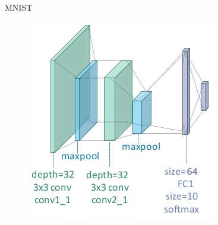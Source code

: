 \documentclass{beamer}
\begin{document}
\begin{frame}{MNIST}
			\begin{figure}
		\includegraphics[width=0.6\columnwidth]{pres_pics/MNIST}
	\end{figure}
\end{frame}
\end{document}
